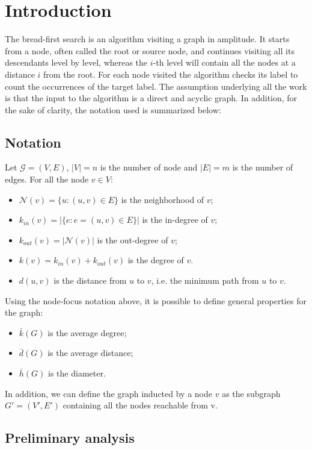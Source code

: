 
\section{Introduction}
The bread-first search is an algorithm visiting a graph in amplitude. It starts from a node, 
often called the root or source node, and continues visiting all its descendants level
by level, whereas the $i$-th level will contain all the nodes at a distance 
$i$ from the root.
For each node visited the algorithm checks its label to count the occurrences of the target label.
The assumption underlying all the work is that the input to the algorithm is a direct and 
acyclic graph. In addition, for the sake of clarity, the notation used is summarized below:
\subsection{Notation}
Let $\mathcal{G} = (V, E)$, $|V| = n$ is the number of node and $|E| = m$ is the number of edges. 
For all the node $v \in V$:
\begin{itemize}
    \item $\mathcal{N}(v) = \{u : (u, v) \in E\}$ is the neighborhood of $v$;
    \item $k_{in}(v) = |\{e: e=(u, v) \in E\}|$ is the in-degree of $v$;
    \item $k_{out}(v) = |\mathcal{N}(v)|$ is the out-degree of $v$;
    \item $k(v) = k_{in}(v) + k_{out}(v)$ is the degree of $v$.
    \item $d(u, v)$ is the distance from $u$ to $v$, i.e. the minimum path from $u$ to $v$.
\end{itemize}
Using the node-focus notation above,
 it is possible to define general properties for the graph:
\begin{itemize}
    \item $\bar{k}(G)$ is the average degree;
    \item $\bar{d}(G)$ is the average distance;
    \item $\bar{h}(G)$ is the diameter.
\end{itemize}
In addition, we can define 
the graph inducted by a node $v$ as the subgraph $G'=(V', E')$ containing all the nodes reachable from v.  
\subsection{Preliminary analysis}
